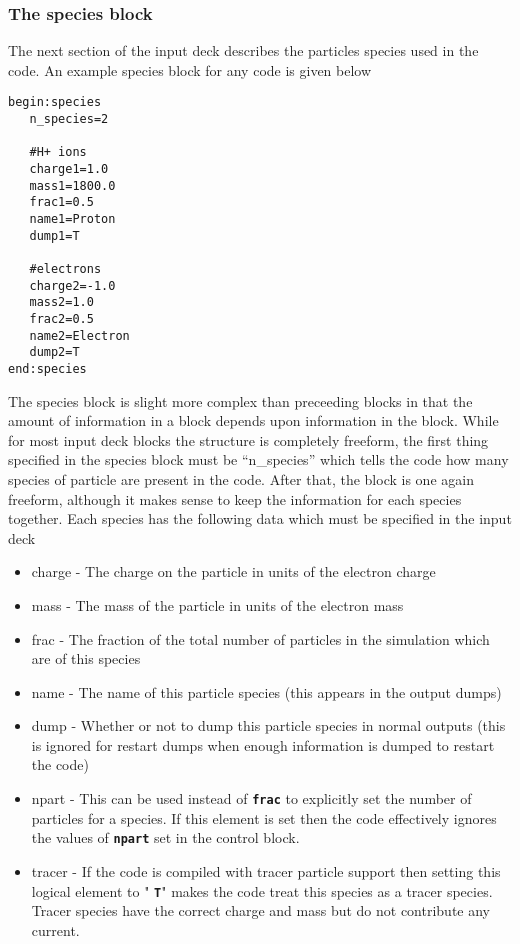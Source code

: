 \documentclass[12pt,a4paper]{article}
\newcommand{\simpleboxverbatim}{\begin{Verbatim}[obeytabs=true,frame=single,
  framerule=0.5mm,rulecolor=\color{warwickmid},formatcom=\color{black}]}
\newcommand{\inlinecode}[1]{{\color{warwickred} \bf\texttt{#1}}}
\newcommand{\EPOCH}{{\color{warwickdark}\fontfamily{phv}\selectfont{EPOCH}}}
\begin{document}
\subsubsection{The species block}
The next section of the input deck describes the particles species used in the
code. An example species block for any {\EPOCH} code is given below\\
\simpleboxverbatim
begin:species
   n_species=2

   #H+ ions
   charge1=1.0
   mass1=1800.0
   frac1=0.5
   name1=Proton
   dump1=T

   #electrons
   charge2=-1.0
   mass2=1.0
   frac2=0.5
   name2=Electron
   dump2=T
end:species
\end{Verbatim}

The species block is slight more complex than preceeding blocks in that the
amount of information in a block depends upon information in the block. While
for most input deck blocks the structure is completely freeform, the first
thing specified in the species block must be ``n\_species'' which tells the
code how many species of particle are present in the code. After that, the
block is one again freeform, although it makes sense to keep the information
for each species together. Each species has the following data which must be
specified in the input deck\\
\begin{itemize}
\item charge - The charge on the particle in units of the electron charge
\item mass - The mass of the particle in units of the electron mass
\item frac - The fraction of the total number of particles in the simulation
  which are of this species
\item name - The name of this particle species (this appears in the output
  dumps)
\item dump - Whether or not to dump this particle species in normal outputs
  (this is ignored for restart dumps when enough information is dumped to
  restart the code)
\item npart - This can be used instead of \inlinecode{frac} to explicitly set
  the number of particles for a species. If this element is set then the code
  effectively ignores the values of \inlinecode{npart} set in the control
  block.
\item tracer - If the code is compiled with tracer particle support then
  setting this logical element to "\inlinecode{T}" makes the code treat this
  species as a tracer species. Tracer species have the correct charge and mass
  but do not contribute any current.
\end{itemize}
\end{document}
